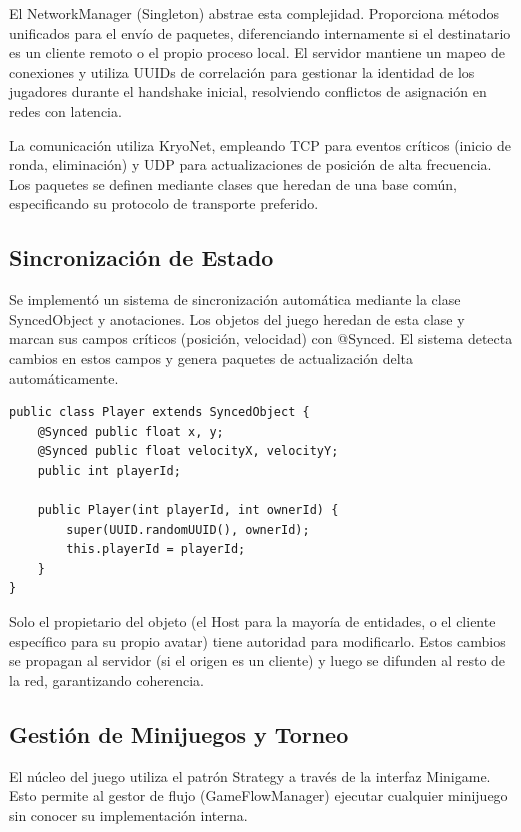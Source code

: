 \documentclass[conference]{IEEEtran}
\begin{document}
El NetworkManager (Singleton) abstrae esta complejidad. Proporciona métodos unificados para el envío de paquetes, diferenciando internamente si el destinatario es un cliente remoto o el propio proceso local. El servidor mantiene un mapeo de conexiones y utiliza UUIDs de correlación para gestionar la identidad de los jugadores durante el handshake inicial, resolviendo conflictos de asignación en redes con latencia.

La comunicación utiliza KryoNet, empleando TCP para eventos críticos (inicio de ronda, eliminación) y UDP para actualizaciones de posición de alta frecuencia. Los paquetes se definen mediante clases que heredan de una base común, especificando su protocolo de transporte preferido.

\subsection{Sincronización de Estado}

Se implementó un sistema de sincronización automática mediante la clase SyncedObject y anotaciones. Los objetos del juego heredan de esta clase y marcan sus campos críticos (posición, velocidad) con @Synced. El sistema detecta cambios en estos campos y genera paquetes de actualización delta automáticamente.

\begin{lstlisting}[caption={Estructura base para objetos sincronizados.},label={lst:synced}]
public class Player extends SyncedObject {
    @Synced public float x, y;
    @Synced public float velocityX, velocityY;
    public int playerId;
    
    public Player(int playerId, int ownerId) {
        super(UUID.randomUUID(), ownerId);
        this.playerId = playerId;
    }
}
\end{lstlisting}

Solo el propietario del objeto (el Host para la mayoría de entidades, o el cliente específico para su propio avatar) tiene autoridad para modificarlo. Estos cambios se propagan al servidor (si el origen es un cliente) y luego se difunden al resto de la red, garantizando coherencia.

\subsection{Gestión de Minijuegos y Torneo}

El núcleo del juego utiliza el patrón Strategy a través de la interfaz Minigame. Esto permite al gestor de flujo (GameFlowManager) ejecutar cualquier minijuego sin conocer su implementación interna.
\end{document}

